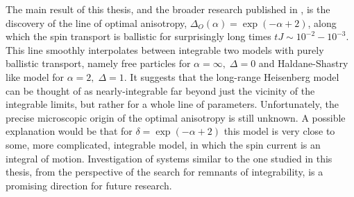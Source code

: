 The main result of this thesis, and the broader research published in \autocite{Mierzejewski2023}, is the
discovery of the line of optimal anisotropy, \(\Delta_{O}(\alpha) = \exp(-\alpha +2)\), 
along which the spin transport is ballistic for surprisingly long times \(tJ \sim 10^{-2} -10^{-3}\).
This line smoothly interpolates between integrable two models with purely ballistic
transport, namely free particles for \(\alpha =\infty,\; \Delta =0\) and Haldane-Shastry
like model for \(\alpha  = 2,\; \Delta  = 1\). It suggests that the long-range Heisenberg
model can be thought of as nearly-integrable far beyond just the vicinity of the
integrable limits, but rather for a whole line of parameters. Unfortunately, the precise
microscopic origin of the optimal anisotropy is still unknown. A possible explanation
would be that for \(\delta = \exp(-\alpha  + 2)\) this model is very close to some,
more complicated, integrable model, in which the spin current is an integral of motion.
Investigation of systems similar to the one studied in this thesis, from the perspective
of the search for remnants of integrability, is a promising direction for future research.
